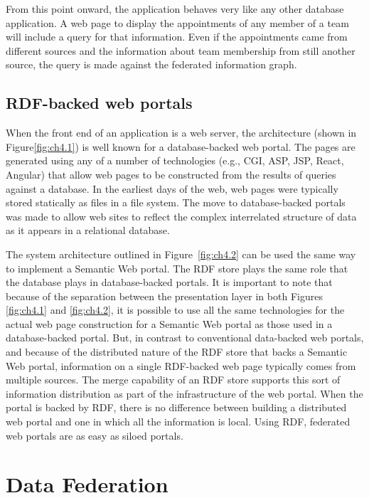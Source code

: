 From this point onward, the application behaves very like any other
database application. A web page to display the appointments of any
member of a team will include a query for that information. Even if the
appointments came from different sources and the information about team
membership from still another source, the query is made against the
federated information graph.

\subsection{RDF-backed web portals}

When the front end of an application is a web server, the architecture
(shown in Figure\ref{fig:ch4.1}) is well known for a database-backed web portal.
The pages are generated using any of a number of technologies (e.g.,
CGI, ASP, JSP, React, Angular) that allow web pages to be constructed
from the results of queries against a database. In the earliest days of
the web, web pages were typically stored statically as files in a file
system. The move to database-backed portals was made to allow web sites
to reflect the complex interrelated structure of data as it appears in a
relational database.

The system architecture outlined in Figure~\ref{fig:ch4.2} can be used the same way
to implement a Semantic Web portal. The RDF store plays the same role
that the database plays in database-backed portals. It is important to
note that because of the separation between the presentation layer in
both Figures \ref{fig:ch4.1} and \ref{fig:ch4.2}, it is possible to use all the same 
technologies for the actual web
page construction for a Semantic Web portal as those used in a
database-backed portal. But, in contrast to conventional data-backed web
portals, and because of the distributed nature of the RDF store that
backs a Semantic Web portal, information on a single RDF-backed web page
typically comes from multiple sources. The merge capability of an RDF
store supports this sort of information distribution as part of the
infrastructure of the web portal. When the portal is backed by RDF,
there is no difference between building a distributed web portal and one
in which all the information is local. Using RDF, federated web portals
are as easy as siloed portals.

\section{Data Federation}

